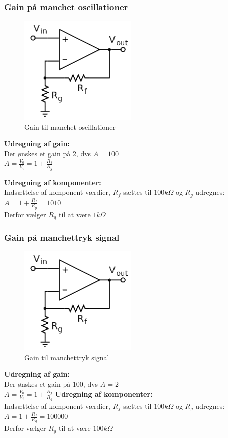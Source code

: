 \subsubsection{Gain på manchet oscillationer }
\begin{figure}[H]
	\centering
	\includegraphics[width = 0.5\textwidth]{billeder/OpAMP_gain.png}
	\caption{Gain til manchet oscillationer}\label{fig:opam1}
\end{figure}
\textbf{Udregning af gain: } \\
Der ønskes et gain på 2, dvs $A = 100$ \\
$ A = \frac{V_0}{V_i} = 1 + \frac{R_f}{R_g}$

\textbf{Udregning af komponenter:}\\
Indsættelse af komponent værdier, $R_f$ sættes til $100k\Omega$ og $R_g$ udregnes: \\
$ A = 1 + \frac{R_f}{R_g} = 1010$ \\
Derfor vælger $R_g$ til at være $1k\Omega$

\subsubsection{Gain på manchettryk signal }
\begin{figure}[H]
	\centering
	\includegraphics[width = 0.5\textwidth]{billeder/OpAMP_gain.png}
	\caption{Gain til manchettryk signal}\label{fig:opam2}
\end{figure}
\textbf{Udregning af gain: } \\
Der ønskes et gain på 100, dvs $A = 2$ \\
$ A = \frac{V_0}{V_i} = 1 + \frac{R_f}{R_g}$
\textbf{Udregning af komponenter:}\\
Indsættelse af komponent værdier, $R_f$ sættes til $100k\Omega$ og $R_g$ udregnes: \\
$ A = 1 + \frac{R_f}{R_g} = 100000$ \\
Derfor vælger $R_g$ til at være $100k\Omega$